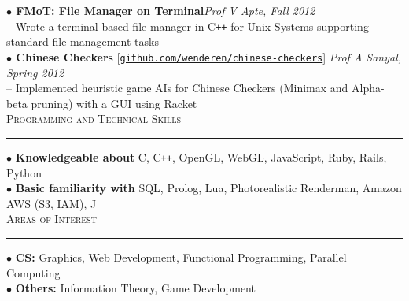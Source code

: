 \documentclass[a4paper,9pt]{article}
\begin{document}
\textbf{$\bullet$ FMoT: File Manager on Terminal}\hfill \textit{Prof V Apte, Fall 2012}\\
-- Wrote a terminal-based file manager in C\texttt{++} for Unix Systems supporting standard file management tasks\\
\textbf{$\bullet$ Chinese Checkers} [\href{https://github.com/wenderen/chinese-checkers}{\texttt{github.com/wenderen/chinese-checkers}}] \hfill \textit{Prof A Sanyal, Spring 2012}\\
-- Implemented heuristic game AIs for Chinese Checkers (Minimax and Alpha-beta pruning) with a GUI using Racket\\

\Large{\textsc{Programming and Technical Skills}}\vspace{1.5pt}
\hrule\vspace{0.25cm}
\small
$\bullet$ \textbf{Knowledgeable about} C, C\verb!++!, OpenGL, WebGL, JavaScript, Ruby, Rails, Python\\
$\bullet$ \textbf{Basic familiarity with} SQL, Prolog, Lua, Photorealistic Renderman, Amazon AWS (S3, IAM), J\\

\Large{\textsc{Areas of Interest}}\vspace{1.5pt}
\hrule\vspace{0.25cm}
\small
$\bullet$ \textbf{CS:} Graphics, Web Development, Functional Programming, Parallel Computing\\
$\bullet$ \textbf{Others:} Information Theory, Game Development\\
\end{document}
